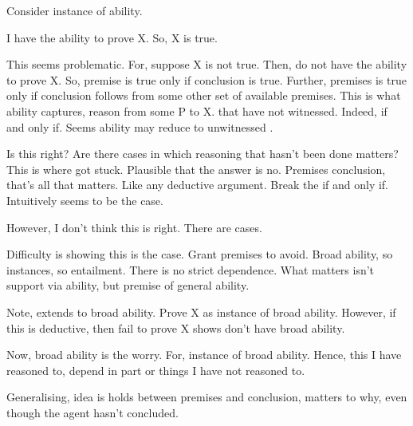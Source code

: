 \begin{note}
  Consider instance of ability.

  I have the ability to prove X.
  So, X is true.

  This seems problematic.
  For, suppose X is not true.
  Then, do not have the ability to prove X.
  So, premise is true only if conclusion is true.
  Further, premises is true only if conclusion follows from some other set of available premises.
  This is what ability captures, reason from some P to X.
   that have not witnessed.
  Indeed, if and only if.
  Seems ability may reduce to unwitnessed \support{}.

  Is this right?
  Are there cases in which reasoning that hasn't been done matters?
  This is where got stuck.
  Plausible that the answer is no.
  Premises conclusion, that's all that matters.
  Like any deductive argument.
  Break the if and only if.
  Intuitively seems to be the case.

  However, I don't think this is right.
  There are cases.

  Difficulty is showing this is the case.
  Grant premises to avoid.
  Broad ability, so instances, so entailment.
  There is no strict dependence.
  What matters isn't support via ability, but premise of general ability.

  Note, extends to broad ability.
  Prove X as instance of broad ability.
  However, if this is deductive, then fail to prove X shows don't have broad ability.

  Now, broad ability is the worry.
  For, instance of broad ability.
  Hence, this I have reasoned to, depend in part or things I have not reasoned to.

  Generalising, idea is \support{} holds between premises and conclusion, matters to why, even though the agent hasn't concluded.

\end{note}






